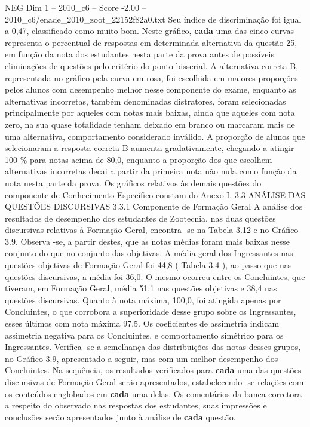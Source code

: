 \begin{textsample}{NEG Dim 1 – 2010\_c6 – Score -2.00 – 2010\_c6/enade\_2010\_zoot\_22152f82a0.txt}
Seu índice de discriminação foi igual a 0,47, classificado como muito bom.
Neste gráfico, \textbf{cada} uma das cinco curvas representa o percentual de respostas em determinada alternativa da questão 25, em função da nota dos estudantes nesta parte da prova antes de possíveis eliminações de questões pelo critério do ponto bisserial.
A alternativa correta B, representada no gráfico pela curva em rosa, foi escolhida em maiores proporções pelos alunos com desempenho melhor nesse componente do exame, enquanto as alternativas incorretas, também denominadas distratores, foram selecionadas principalmente por aqueles com notas mais baixas, ainda que aqueles com nota zero, na sua quase totalidade tenham deixado em branco ou marcaram mais de uma alternativa, comportamento considerado inválido.
A proporção de alunos que selecionaram a resposta correta B aumenta gradativamente, chegando a atingir 100 \% para notas acima de 80,0, enquanto a proporção dos que escolhem alternativas incorretas decai a partir da primeira nota não nula como função da nota nesta parte da prova.
Os gráficos relativos às demais questões do componente de Conhecimento Específico constam do Anexo I. 3.3 ANÁLISE DAS QUESTÕES DISCURSIVAS 3.3.1 Componente de Formação Geral A análise dos resultados de desempenho dos estudantes de Zootecnia, nas duas questões discursivas relativas à Formação Geral, encontra -se na Tabela 3.12 e no Gráfico 3.9.
Observa -se, a partir destes, que as notas médias foram mais baixas nesse conjunto do que no conjunto das objetivas.
A média geral dos Ingressantes nas questões objetivas de Formação Geral foi 44,8 ( Tabela 3.4 ), ao passo que nas questões discursivas, a média foi 36,0.
O mesmo ocorreu entre os Concluintes, que tiveram, em Formação Geral, média 51,1 nas questões objetivas e 38,4 nas questões discursivas.
Quanto à nota máxima, 100,0, foi atingida apenas por Concluintes, o que corrobora a superioridade desse grupo sobre os Ingressantes, esses últimos com nota máxima 97,5.
Os coeficientes de assimetria indicam assimetria negativa para os Concluintes, e comportamento simétrico para os Ingressantes.
Verifica -se a semelhança das distribuições das notas desses grupos, no Gráfico 3.9, apresentado a seguir, mas com um melhor desempenho dos Concluintes.
Na sequência, os resultados verificados para \textbf{cada} uma das questões discursivas de Formação Geral serão apresentados, estabelecendo -se relações com os conteúdos englobados em \textbf{cada} uma delas.
Os comentários da banca corretora a respeito do observado nas respostas dos estudantes, suas impressões e conclusões serão apresentados junto à análise de \textbf{cada} questão.

\end{textsample}
